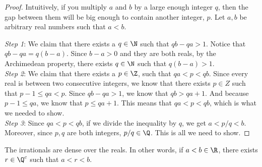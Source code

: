 \documentclass[10pt]{article}
\begin{document}
\begin{proof}
    Intuitively, if you multiply $a$ and $b$ by a large enough integer $q$, then the gap between them will be big enough to contain another integer, $p$. Let $a,b$ be arbitrary real numbers such that $a<b$.
    \begin{center}
    \end{center}
    \textit{Step 1}: We claim that there exists a $q\in\N$ such that $qb-qa>1$. Notice that $qb-qa=q(b-a)$. Since $b-a>0$ and they are both reals, by the Archimedean property, there exists $q\in\N$ such that $q(b-a)>1$.\\
    \textit{Step 2}: We claim that there exists a $p\in\Z$, such that $qa<p<qb$. Since every real is between two consecutive integers, we know that there exists $p\in Z$ such that $p-1\leq qa<p$. Since $qb-qa>1$, we know that $qb>qa+1$. And because $p-1\leq qa$, we know that $p\leq qa+1$. This means that $qa<p<qb$, which is what we needed to show.\\
    \textit{Step 3}: Since $qa<p<qb$, if we divide the inequality by $q$, we get $a<{p}/{q}<b$. Moreover, since $p,q$ are both integers, ${p}/{q}\in\Q$. This is all we need to show.
\end{proof}
\begin{corollary}
    The irrationals are dense over the reals. In other words, if $a<b\in\R$, there exists $ r\in\Q^c$ such that $a<r<b$.
\end{corollary}
\end{document}
